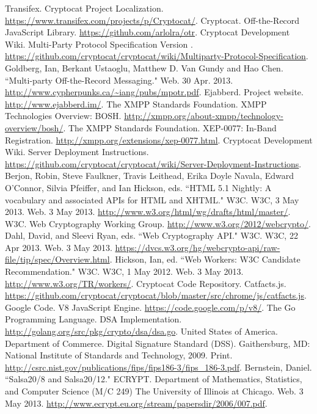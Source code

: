 \documentclass[letterpaper,twocolumn,10pt]{article}
\begin{document}
\begin{thebibliography}{1}
 Transifex. Cryptocat Project Localization. \url{https://www.transifex.com/projects/p/Cryptocat/}.
 Cryptocat. Off-the-Record JavaScript Library. \url{https://github.com/arlolra/otr}.
 Cryptocat Development Wiki. Multi-Party Protocol Specification Version . \url{https://github.com/cryptocat/cryptocat/wiki/Multiparty-Protocol-Specification}.
 Goldberg, Ian, Berkant Ustaoglu, Matthew D. Van Gundy and Hao Chen. ``Multi-party Off-the-Record Messaging." Web. 30 Apr. 2013. \url{http://www.cypherpunks.ca/~iang/pubs/mpotr.pdf}.
 Ejabberd. Project website. \url{http://www.ejabberd.im/}.
 The XMPP Standards Foundation. XMPP Technologies Overview: BOSH. \url{http://xmpp.org/about-xmpp/technology-overview/bosh/}.
 The XMPP Standards Foundation. XEP-0077: In-Band Registration. \url{http://xmpp.org/extensions/xep-0077.html}.
 Cryptocat Development Wiki. Server Deployment Instructions. \url{https://github.com/cryptocat/cryptocat/wiki/Server-Deployment-Instructions}.
 Berjon, Robin, Steve Faulkner, Travis Leithead, Erika Doyle Navala, Edward O'Connor, Silvia Pfeiffer, and Ian Hickson, eds. ``HTML 5.1 Nightly: A vocabulary and associated APIs for HTML and XHTML." W3C. W3C, 3 May 2013. Web. 3 May 2013. \url{http://www.w3.org/html/wg/drafts/html/master/}.
 W3C. Web Cryptography Working Group. \url{http://www.w3.org/2012/webcrypto/}.
 Dahl, David, and Sleevi Ryan, eds. ``Web Cryptography API." W3C. W3C, 22 Apr 2013. Web. 3 May 2013. \url{https://dvcs.w3.org/hg/webcrypto-api/raw-file/tip/spec/Overview.html}.
 Hickson, Ian, ed. ``Web Workers: W3C Candidate Recommendation." W3C. W3C, 1 May 2012. Web. 3 May 2013. \url{http://www.w3.org/TR/workers/}.
 Cryptocat Code Repository. Catfacts.js. \url{https://github.com/cryptocat/cryptocat/blob/master/src/chrome/js/catfacts.js}.
 Google Code. V8 JavaScript Engine. \url{https://code.google.com/p/v8/}.
 The Go Programming Language. DSA Implementation. \url{http://golang.org/src/pkg/crypto/dsa/dsa.go}.
 United States of America. Department of Commerce. Digital Signature Standard (DSS). Gaithersburg, MD: National Institute of Standards and Technology, 2009. Print. \url{http://csrc.nist.gov/publications/fips/fips186-3/fips_186-3.pdf}.
 Bernstein, Daniel. ``Salsa20/8 and Salsa20/12." ECRYPT. Department of Mathematics, Statistics, and Computer Science (M/C 249) The University of Illinois at Chicago. Web. 3 May 2013. \url{http://www.ecrypt.eu.org/stream/papersdir/2006/007.pdf}.

\end{thebibliography}
\end{document}

